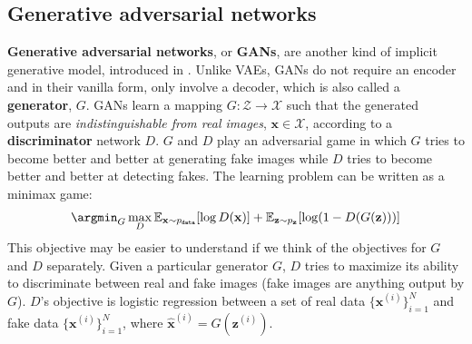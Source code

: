 



\subsection{Generative adversarial networks}

{\bf Generative adversarial networks}, or {\bf GANs}, are another kind of implicit generative model, introduced in \cite{goodfellow2014generative}. Unlike VAEs, GANs do not require an encoder and in their vanilla form, only involve a decoder, which is also called a {\bf generator}, $G$. GANs learn a mapping $G: \mathcal{Z} \rightarrow \mathcal{X}$ such that the generated outputs are \textit{indistinguishable from real images}, $\mathbf{x} \in \mathcal{X}$, according to a {\bf discriminator} network $D$. $G$ and $D$ play an adversarial game in which $G$ tries to become better and better at generating fake images while $D$ tries to become better and better at detecting fakes. The learning problem can be written as a minimax game:
\begin{align}
    \argmin_G\max_D \mathbb{E}_{\mathbf{x} \sim p_{\texttt{data}}}[\log D(\mathbf{x})] + \mathbb{E}_{\mathbf{z} \sim p_{\mathbf{z}}}[\log (1-D(G(\mathbf{z})))]\label{eqn:generative_models:GAN_learning_problem}
\end{align}
This objective may be easier to understand if we think of the objectives for $G$ and $D$ separately. Given a particular generator $G$, $D$ tries to maximize its ability to discriminate between real and fake images (fake images are anything output by $G$). $D$'s objective is logistic regression between a set of real data $\{\mathbf{x}^{(i)}\}_{i=1}^N$ and fake data $\{\mathbf{x}^{(i)}\}_{i=1}^N$, where $\hat{\mathbf{x}}^{(i)} = G(\mathbf{z}^{(i)})$.

